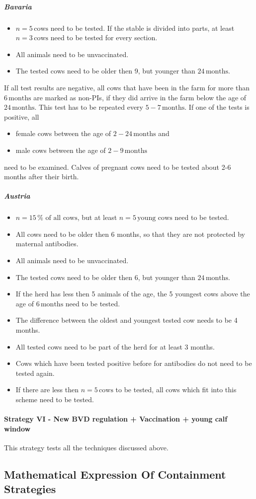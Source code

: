 \subparagraph{Bavaria}
\begin{itemize}
\item $n = 5\,\text{cows}$ need to be tested. If the stable is divided into parts, at least $n = 3\,\text{cows}$ need to be tested for every section. 
\item All animals need to be unvaccinated.
\item The tested cows need to be older then 9, but younger than $24\,\text{months}$.
\end{itemize}
If all test results are negative, all cows that have been in the farm for more than $6\,\text{months}$ are marked as non-PIs, if they did arrive in the farm below the age of $24\,\text{months}$. This test has to be repeated every $5-7\,\text{months}$.
If one of the tests is positive, all 
\begin{itemize}
\item female cows between the age of $2-24\,\text{months}$ and
\item male cows between the age of $2-9\,\text{months}$
\end{itemize}
need to be examined. Calves of pregnant cows need to be tested about 2-6 months after their birth.
\subparagraph{Austria}
\begin{itemize}
\item $n = 15\,\%\text{ of all cows}$, but at least $n = 5\,\text{young cows}$ need to be tested.
\item All cows need to be older then 6 months, so that they are not protected by maternal antibodies.
\item All animals need to be unvaccinated.
\item The tested cows need to be older then 6, but younger than $24\,\text{months}$.
\item If the herd has less then 5 animals of the age, the 5 youngest cows above the age of $6\,\text{months}$  need to be tested.
\item The difference between the oldest and youngest tested cow needs to be 4 months. 
\item All tested cows need to be part of the herd for at least 3 months.
\item Cows which have been tested positive before for antibodies do not need to be tested again.
\item If there are less then $n = 5\,\text{cows}$ to be tested, all cows which fit into this scheme need to be tested.
\end{itemize}
\paragraph{Strategy VI - New BVD regulation + Vaccination + young calf window} 
This strategy tests all the techniques discussed above.
\subsection{Mathematical Expression Of Containment Strategies}